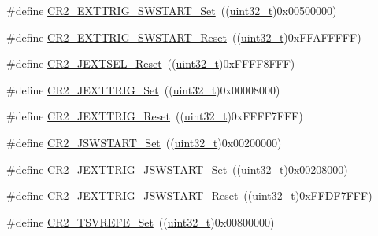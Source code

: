 \begin{DoxyCompactItemize}
\item 
\#define \hyperlink{group___a_d_c___private___defines_gad9bed838631a650428d2318694a66094}{C\+R2\+\_\+\+E\+X\+T\+T\+R\+I\+G\+\_\+\+S\+W\+S\+T\+A\+R\+T\+\_\+\+Set}~((\hyperlink{_p_e___types_8h_a33594304e786b158f3fb30289278f5af}{uint32\+\_\+t})0x00500000)
\item 
\#define \hyperlink{group___a_d_c___private___defines_gad0a6e5cf09868318178434340ade2fe1}{C\+R2\+\_\+\+E\+X\+T\+T\+R\+I\+G\+\_\+\+S\+W\+S\+T\+A\+R\+T\+\_\+\+Reset}~((\hyperlink{_p_e___types_8h_a33594304e786b158f3fb30289278f5af}{uint32\+\_\+t})0x\+F\+F\+A\+F\+F\+F\+F\+F)
\item 
\#define \hyperlink{group___a_d_c___private___defines_gafa78c11893aa39ad2c0117414ae1704d}{C\+R2\+\_\+\+J\+E\+X\+T\+S\+E\+L\+\_\+\+Reset}~((\hyperlink{_p_e___types_8h_a33594304e786b158f3fb30289278f5af}{uint32\+\_\+t})0x\+F\+F\+F\+F8\+F\+F\+F)
\item 
\#define \hyperlink{group___a_d_c___private___defines_ga20a54958799c567e9efaa0635aa18a99}{C\+R2\+\_\+\+J\+E\+X\+T\+T\+R\+I\+G\+\_\+\+Set}~((\hyperlink{_p_e___types_8h_a33594304e786b158f3fb30289278f5af}{uint32\+\_\+t})0x00008000)
\item 
\#define \hyperlink{group___a_d_c___private___defines_ga94404d5a0103c5e2d7ffa45956356931}{C\+R2\+\_\+\+J\+E\+X\+T\+T\+R\+I\+G\+\_\+\+Reset}~((\hyperlink{_p_e___types_8h_a33594304e786b158f3fb30289278f5af}{uint32\+\_\+t})0x\+F\+F\+F\+F7\+F\+F\+F)
\item 
\#define \hyperlink{group___a_d_c___private___defines_ga5292617782f3327f2e1ed0bd9461704e}{C\+R2\+\_\+\+J\+S\+W\+S\+T\+A\+R\+T\+\_\+\+Set}~((\hyperlink{_p_e___types_8h_a33594304e786b158f3fb30289278f5af}{uint32\+\_\+t})0x00200000)
\item 
\#define \hyperlink{group___a_d_c___private___defines_gaac5989ccf10d806f2f6a70f925d6b130}{C\+R2\+\_\+\+J\+E\+X\+T\+T\+R\+I\+G\+\_\+\+J\+S\+W\+S\+T\+A\+R\+T\+\_\+\+Set}~((\hyperlink{_p_e___types_8h_a33594304e786b158f3fb30289278f5af}{uint32\+\_\+t})0x00208000)
\item 
\#define \hyperlink{group___a_d_c___private___defines_gaaa2fb01c1649fde61115602559942ee2}{C\+R2\+\_\+\+J\+E\+X\+T\+T\+R\+I\+G\+\_\+\+J\+S\+W\+S\+T\+A\+R\+T\+\_\+\+Reset}~((\hyperlink{_p_e___types_8h_a33594304e786b158f3fb30289278f5af}{uint32\+\_\+t})0x\+F\+F\+D\+F7\+F\+F\+F)
\item 
\#define \hyperlink{group___a_d_c___private___defines_ga7f5e0f807edebbfcef4883f3ec42b9e8}{C\+R2\+\_\+\+T\+S\+V\+R\+E\+F\+E\+\_\+\+Set}~((\hyperlink{_p_e___types_8h_a33594304e786b158f3fb30289278f5af}{uint32\+\_\+t})0x00800000)

\end{DoxyCompactItemize}
